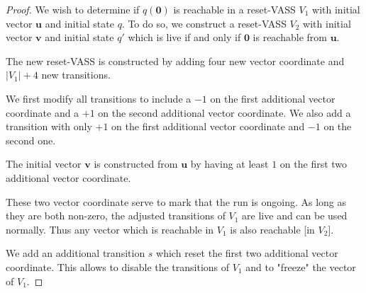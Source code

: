 \begin{proof}


We wish to determine if $q(\textbf{0})$ is reachable in a reset-VASS $V_1$
with
initial vector $\textbf{u}$ and initial state $q$.
To do so, we construct a reset-VASS $V_2$
with initial vector $\textbf{v}$ and initial state $q'$
which is live if and only if 
$\textbf{0}$
is reachable from $\textbf{u}$.


The new reset-VASS is constructed by adding four new vector coordinate
and
$|V_1|+4$ new transitions.

We first modify all transitions to include a $-1$ on the first additional vector coordinate and a $+1$ on the second additional vector coordinate. We also add a transition with only $+1$ on the first additional vector coordinate and $-1$ on the second one.



The initial vector $\textbf{v}$ is constructed from $\textbf{u}$ by having at least $1$ on the first two additional vector coordinate.



These two vector coordinate serve to mark that the run is ongoing. As long as they are both non-zero, the adjusted transitions of $V_1$ are live and can be used normally. Thus any vector which is reachable in $V_1$ is also reachable [in $V_2$].



We add an additional transition $s$ which reset the first two additional vector coordinate.
This allows to disable the transitions of $V_1$ and to "freeze" the vector of $V_1$.



\end{proof}
